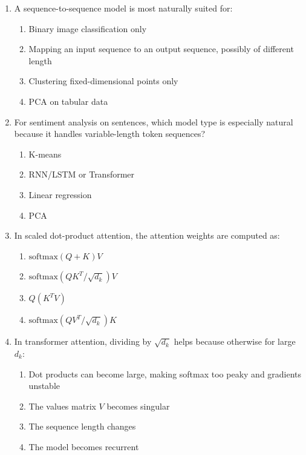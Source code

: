 \documentclass[11pt]{article}
\newcommand{\cmark}{\ding{51}}
\begin{document}
\begin{enumerate}[leftmargin=*]
\item A sequence-to-sequence model is most naturally suited for:

\begin{enumerate}[label=\Alph*.]
    \item Binary image classification only
    \item Mapping an input sequence to an output sequence, possibly of different length \cmark
    \item Clustering fixed-dimensional points only
    \item PCA on tabular data
\end{enumerate}

\item For sentiment analysis on sentences, which model type is especially natural because it handles variable-length token sequences?

\begin{enumerate}[label=\Alph*.]
    \item K-means
    \item RNN/LSTM or Transformer \cmark
    \item Linear regression
    \item PCA
\end{enumerate}

\item In scaled dot-product attention, the attention weights are computed as:

\begin{enumerate}[label=\Alph*.]
    \item $\text{softmax}(Q+K)V$
    \item $\text{softmax}(QK^T/\sqrt{d_k})V$ \cmark
    \item $Q(K^TV)$
    \item $\text{softmax}(QV^T/\sqrt{d_k})K$
\end{enumerate}

\item In transformer attention, dividing by $\sqrt{d_k}$ helps because otherwise for large $d_k$:

\begin{enumerate}[label=\Alph*.]
    \item Dot products can become large, making softmax too peaky and gradients unstable \cmark
    \item The values matrix $V$ becomes singular
    \item The sequence length changes
    \item The model becomes recurrent
\end{enumerate}


\end{enumerate}
\end{document}
